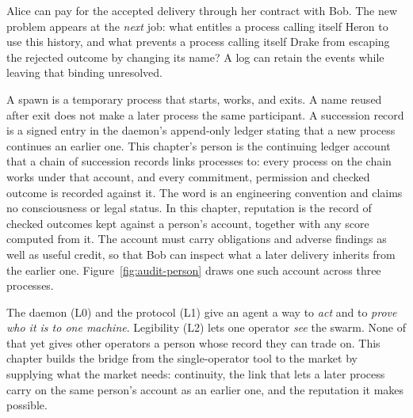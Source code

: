 \documentclass[11pt,a4paper]{article}
\theoremstyle{definition}
\newcounter{protocol}[section]
\begin{document}
Alice can pay for the accepted delivery through her contract with Bob. The
new problem appears at the \emph{next} job: what entitles a process calling
itself Heron to use this history, and what prevents a process calling itself
Drake from escaping the rejected outcome by changing its name? A log can retain
the events while leaving that binding unresolved.

A spawn is a temporary process that starts, works, and exits. A name
reused after exit does not make a later process the same participant. A
succession record is a signed entry in the daemon's append-only ledger
stating that a new process continues an earlier one. This chapter's
person is the continuing ledger account that a chain of succession
records links processes to: every process on the chain works under that
account, and every commitment, permission and checked outcome is recorded
against it. The word is an engineering convention and claims no consciousness
or legal status. In this chapter, reputation is the record of checked
outcomes kept against a person's account, together with any score computed
from it. The account must carry obligations and adverse findings as well as
useful credit, so that Bob can inspect what a later delivery inherits from the
earlier one.
Figure~\ref{fig:audit-person} draws one such account across three processes.



\noindent The
daemon (L0) and the protocol (L1) give an agent a way to \emph{act} and to
\emph{prove who it is to one machine}. Legibility (L2) lets one operator
\emph{see} the swarm. None of that yet gives other operators a person whose
record they can trade on. This chapter builds the bridge from the
single-operator tool to the market by supplying what the market needs:
continuity, the link that lets a later process
carry on the same person's account as an earlier one, and the reputation it makes possible.
\end{document}

